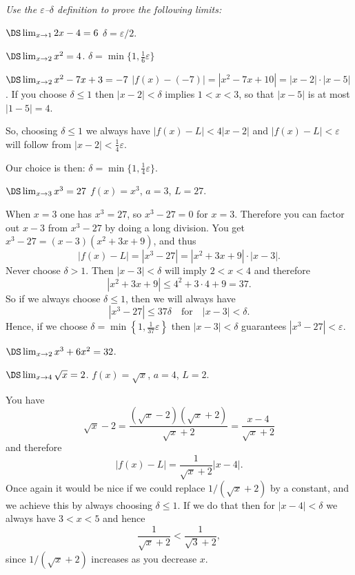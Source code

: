 \begin{center}
  \it Use the $\varepsilon$--$\delta$ definition to prove the following limits:
\end{center}
\begin{multicols}{3}\setlength{\parindent}{0pt}

\problem \(\DS \lim_{x\to 1} 2x-4 = 6 \)
\answer
$\delta = \varepsilon/2$.
\endanswer

\problem \(\DS\lim_{x\to2} x^2 = 4\).
\answer
$\delta = \min \bigl\{1, \frac16\varepsilon\bigr\}$
\endanswer

\problem \(\DS \lim_{x\to 2} x^2-7x +3 = -7 \)
\answer
$|f(x) - (-7) |=|x^2-7x+10| = |x-2|\cdot|x-5| $.  If you choose
$\delta\leq 1$ then $|x-2|<\delta$ implies $1<x<3$, so that $|x-5|$
is at most $|1-5| = 4$.

So, choosing $\delta\leq 1$ we always have $|f(x) - L|<4|x-2|$ and
$|f(x) - L|<\varepsilon$ will follow from $|x-2|<\frac14\varepsilon$.

Our choice is then: $\delta = \min \bigl\{1, \frac14\varepsilon
\bigr\}$.
\endanswer

\problem \(\DS \lim_{x\to 3} x^3 = 27 \)
\answer $f(x) = x^3$, $a=3$, $L=27$.

When $x=3$ one has $x^3=27$, so $x^3-27=0$ for $x=3$.  Therefore you
can factor out $x-3$ from $x^3-27$ by doing a long division.  You get
$x^3-27 = (x-3)(x^2+3x+9)$, and thus
\[
|f(x) - L| = |x^3-27| =|x^2+3x+9|\cdot|x-3|.
\]
Never choose $\delta>1$.  Then $|x-3|<\delta$ will imply $2<x<4$ and
therefore
\[
|x^2+3x+9| \leq 4^2+3\cdot4+9 = 37.
\]
So if we always choose $\delta\leq 1$, then we will always have
\[
|x^3-27|\leq 37\delta \quad\text{for}\quad |x-3|<\delta.
\]
Hence, if we choose $\delta=\min\left\{ 1, \tfrac1{37}\varepsilon
\right\}$ then $|x-3|<\delta$ guarantees $|x^3-27| < \varepsilon$.


\endanswer

\problem \(\DS\lim_{x\to2} x^3 + 6x^2 = 32\).

\problem \label{ex:03limitofsqrt4}
$\DS \lim_{x\to4}\sqrt x = 2$.
\answer
$f(x) = \sqrt x$, $a=4$, $L=2$.

You have
\[
\sqrt x - 2 = \frac{(\sqrt x-2)(\sqrt x +2)}{\sqrt x +2}
=\frac{x-4}{\sqrt x+2}
\]
and therefore
\begin{equation}\label{eq:03sol-fx-L-estimate}
  |f(x) - L | = \frac{1}{\sqrt x+2}|x-4|.
\end{equation}
Once again it would be nice if we could replace $1/(\sqrt x + 2)$ by
a constant, and we achieve this by always choosing $\delta\leq 1$.
If we do that then for $|x-4|<\delta$ we always have $3<x<5$ and
hence
\[
\frac{1}{\sqrt x+2} < \frac{1}{\sqrt 3 +2},
\]
since $1/(\sqrt x+ 2)$ increases as you decrease $x$.


\end{multicols}
